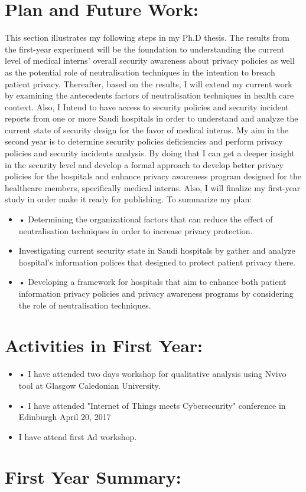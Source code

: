 \section{Plan and Future Work:}
This section illustrates my following steps in my Ph.D thesis. The results from the first-year experiment will be the foundation to understanding the current level of medical interns' overall security awareness about privacy policies as well as the potential role of neutralisation techniques in the intention to breach patient privacy. Thereafter, based on the results, I will extend my current work by examining the antecedents factors of neutralisation techniques in health care context.  Also, I Intend to have access to security policies and security incident reports from one or more Saudi hospitals in order to understand and analyze the current state of security design for the favor of medical interns. My aim in the second year is to determine security policies deficiencies and perform privacy policies and security incidents analysis. By doing that I can get a deeper insight in the security level and develop a formal approach to develop better privacy policies for the hospitals and enhance privacy awareness program designed for the healthcare members, specifically medical interns. Also, I will finalize my first-year study in order make it ready for publishing. To summarize my plan:
\begin{itemize}
	\item •	Determining the organizational factors that can reduce the effect of neutralisation techniques in order to increase privacy protection.
	 \item Investigating current security state in Saudi hospitals by gather and analyze hospital's information polices that designed to protect patient privacy there.
	 \item •	Developing a framework for hospitals that aim to enhance both patient information privacy policies and privacy awareness programs by considering the role of neutralisation techniques.
\end{itemize}
  
\section{Activities in First Year:}

\begin{itemize}
	\item •	I have attended two days workshop for qualitative analysis using Nvivo tool at Glasgow Caledonian University.
	\item •	I have attended "Internet of Things meets Cybersecurity" conference in Edinburgh April 20, 2017
	\item I have attend first Ad workshop.
\end{itemize}

\section{First Year Summary:}
